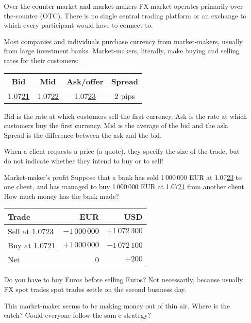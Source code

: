 \documentclass{beamer}
\begin{document}
\begin{frame}{Over-the-counter market and market-makers}
\justify
FX market operates primarily \alert{over-the-counter (OTC)}. There is no single central trading platform or an exchange to which every participant would have to connect to.

\justify
Most companies and individuals purchase currency from market-makers, usually from large investment banks. \alert{Market-makers}, literally, make buying and selling rates for their customers:

\centering
\begin{tabular}{c|c|c|c}
Bid & Mid & Ask/offer & Spread \\ \hline
1.07\underline{21} & 1.07\underline{22} & 1.07\underline{23} & 2 pips
\end{tabular}

\justify
\alert{Bid} is the rate at which customers sell the first currency. \alert{Ask} is the rate at which customers buy the first currency. \alert{Mid} is the average of the bid and the ask. \alert{Spread} is the difference between the ask and the bid.

\justify
When a client requests a price (a quote), they specify the size of the trade, but do not indicate whether they intend to buy or to sell!
\end{frame}



\begin{frame}{Market-maker's profit}
\justify
Suppose that a bank has sold 1\,000\,000 EUR at 1.07\underline{23} to one client, and has managed to buy 1\,000\,000 EUR at 1.07\underline{21} from another client. How much money has the bank made?

\centering
\begin{tabular}{l|r|r}
Trade & EUR & USD \\
\hline
Sell at 1.07\underline{23} & $-1\,000\,000$ & $+1\,072\,300$ \\
Buy at 1.07\underline{21} & $+1\,000\,000$ & $-1\,072\,100$ \\
\hline
Net & 0 & $+200$
\end{tabular}

\justify
Do you have to buy Euros before selling Euros? Not necessarily, because usually FX spot trades spot trades settle on the second business day.

\justify
This market-maker seems to be making money out of thin air. Where is the catch? Could everyone follow the sam	e strategy?
\end{frame}
\end{document}
